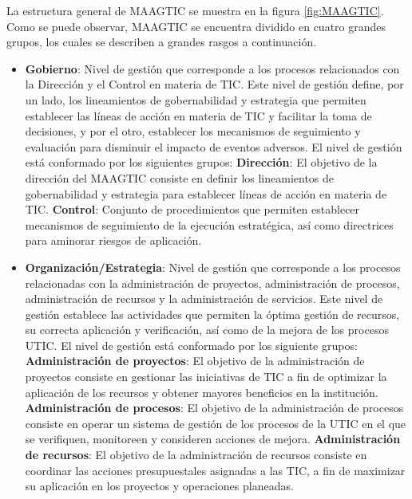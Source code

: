 	La estructura general de MAAGTIC se muestra en la figura \ref{fig:MAAGTIC}. Como se puede observar, MAAGTIC se encuentra dividido en cuatro grandes grupos, los cuales se describen a grandes rasgos a continuación.\\
	
	\begin{itemize}
		\item \textbf{Gobierno}: Nivel de gestión que corresponde a los procesos relacionados con la Dirección y el Control en materia de TIC. Este nivel de gestión define, por un lado, los lineamientos de gobernabilidad y estrategia que permiten establecer las líneas de acción en materia de TIC y facilitar la toma de decisiones, y por el otro, establecer los mecanismos de seguimiento y evaluación para disminuir el impacto de eventos adversos\cite{MAAGTICSIGobierno}. El nivel de gestión está conformado por los siguientes grupos:
			\subitem \textbf{Dirección}: El objetivo de la dirección del MAAGTIC consiste en definir los lineamientos de gobernabilidad y estrategia para establecer líneas de acción en materia de TIC\cite{MAAGTICSIGobierno}.
			\subitem \textbf{Control}: Conjunto de procedimientos que permiten establecer mecanismos de seguimiento de la ejecución estratégica, así como directrices para aminorar riesgos de aplicación\cite{MAAGTICSIGobierno}.
		\item \textbf{Organización/Estrategia}: Nivel de gestión que corresponde a los procesos relacionadas con la administración de proyectos, administración de procesos, administración de recursos y la administración de servicios. Este nivel de gestión establece las actividades que permiten la óptima gestión de recursos, su correcta aplicación y verificación, así como de la mejora de los procesos UTIC\cite{MAAGTICSIOrganizacion}. El nivel de gestión está conformado por los siguiente grupos:
			\subitem \textbf{Administración de proyectos}: El objetivo de la administración de proyectos consiste en gestionar las iniciativas de TIC a fin de optimizar la aplicación de los recursos y obtener mayores beneficios en la institución\cite{MAAGTICSIOrganizacion}.
			\subitem \textbf{Administración de procesos}: El objetivo de la administración de procesos consiste en operar un sistema de gestión de los procesos de la UTIC en el que se verifiquen, monitoreen y consideren acciones de mejora\cite{MAAGTICSIOrganizacion}.
			\subitem \textbf{Administración de recursos}: El objetivo de la administración de recursos consiste en coordinar las acciones presupuestales asignadas a las TIC, a fin de maximizar su aplicación en los proyectos y operaciones planeadas\cite{MAAGTICSIOrganizacion}.

\end{itemize}
